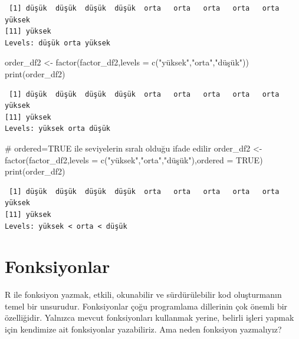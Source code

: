 \documentclass[
  letterpaper,
  DIV=11,
  numbers=noendperiod]{scrreprt}
\newenvironment{Shaded}{\begin{snugshade}}{\end{snugshade}}
\newcommand{\AttributeTok}[1]{\textcolor[rgb]{0.40,0.45,0.13}{#1}}
\newcommand{\CommentTok}[1]{\textcolor[rgb]{0.37,0.37,0.37}{#1}}
\newcommand{\ConstantTok}[1]{\textcolor[rgb]{0.56,0.35,0.01}{#1}}
\newcommand{\FunctionTok}[1]{\textcolor[rgb]{0.28,0.35,0.67}{#1}}
\newcommand{\NormalTok}[1]{\textcolor[rgb]{0.00,0.23,0.31}{#1}}
\newcommand{\OtherTok}[1]{\textcolor[rgb]{0.00,0.23,0.31}{#1}}
\newcommand{\StringTok}[1]{\textcolor[rgb]{0.13,0.47,0.30}{#1}}
\begin{document}
\begin{verbatim}
 [1] düşük  düşük  düşük  düşük  orta   orta   orta   orta   orta   yüksek
[11] yüksek
Levels: düşük orta yüksek
\end{verbatim}

\begin{Shaded}
\begin{Highlighting}[]
\NormalTok{order\_df2 }\OtherTok{\textless{}{-}} \FunctionTok{factor}\NormalTok{(factor\_df2,}\AttributeTok{levels =} \FunctionTok{c}\NormalTok{(}\StringTok{"yüksek"}\NormalTok{,}\StringTok{"orta"}\NormalTok{,}\StringTok{"düşük"}\NormalTok{))}
\FunctionTok{print}\NormalTok{(order\_df2)}
\end{Highlighting}
\end{Shaded}

\begin{verbatim}
 [1] düşük  düşük  düşük  düşük  orta   orta   orta   orta   orta   yüksek
[11] yüksek
Levels: yüksek orta düşük
\end{verbatim}

\begin{Shaded}
\begin{Highlighting}[]
\CommentTok{\# ordered=TRUE ile seviyelerin sıralı olduğu ifade edilir}
\NormalTok{order\_df2 }\OtherTok{\textless{}{-}} \FunctionTok{factor}\NormalTok{(factor\_df2,}\AttributeTok{levels =} \FunctionTok{c}\NormalTok{(}\StringTok{"yüksek"}\NormalTok{,}\StringTok{"orta"}\NormalTok{,}\StringTok{"düşük"}\NormalTok{),}\AttributeTok{ordered =} \ConstantTok{TRUE}\NormalTok{)}
\FunctionTok{print}\NormalTok{(order\_df2)}
\end{Highlighting}
\end{Shaded}

\begin{verbatim}
 [1] düşük  düşük  düşük  düşük  orta   orta   orta   orta   orta   yüksek
[11] yüksek
Levels: yüksek < orta < düşük
\end{verbatim}

\chapter{Fonksiyonlar}\label{fonksiyonlar}

R ile fonksiyon yazmak, etkili, okunabilir ve sürdürülebilir kod
oluşturmanın temel bir unsurudur. Fonksiyonlar çoğu programlama
dillerinin çok önemli bir özelliğidir. Yalnızca mevcut fonksiyonları
kullanmak yerine, belirli işleri yapmak için kendimize ait fonksiyonlar
yazabiliriz. Ama neden fonksiyon yazmalıyız?
\end{document}
